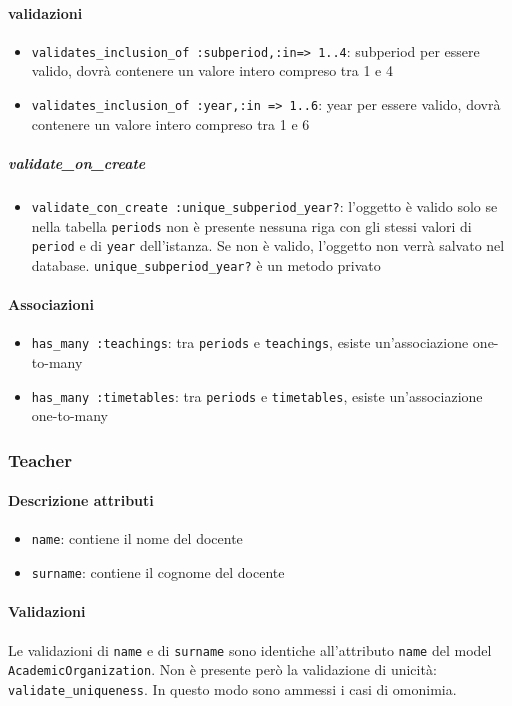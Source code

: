 \documentclass[11pt,a4paper]{article}
\begin{document}
\paragraph{validazioni}
\begin{itemize}
 \item \verb|validates_inclusion_of :subperiod,:in=> 1..4|: subperiod per essere valido, dovrà contenere un valore intero compreso tra 1 e 4
\item \verb|validates_inclusion_of :year,:in => 1..6|: year per essere valido, dovrà contenere un valore intero compreso tra 1 e 6
\end{itemize}
\subparagraph{validate\_on\_create} 
\begin{itemize}
 \item \verb|validate_con_create :unique_subperiod_year?|: l'oggetto è valido solo se nella tabella \verb|periods| non è presente nessuna riga con gli stessi valori di \verb|period| e di \verb|year| dell'istanza. 
Se non è valido, l'oggetto non verrà salvato nel database. \verb|unique_subperiod_year?| è un metodo privato
\end{itemize}
\paragraph{Associazioni}
\begin{itemize}
 \item \verb|has_many :teachings|: tra \verb|periods| e \verb|teachings|, esiste un'associazione one-to-many
 \item \verb|has_many :timetables|: tra \verb|periods| e \verb|timetables|, esiste un'associazione one-to-many
\end{itemize}
\subsubsection{Teacher}
\paragraph{Descrizione attributi}
\begin{itemize}
 \item \verb|name|: contiene il nome del docente
 \item \verb|surname|: contiene il cognome del docente
\end{itemize}
\paragraph{Validazioni}
Le validazioni di \verb|name| e di \verb|surname| sono identiche all'attributo \verb|name| del model \verb|AcademicOrganization|. Non è presente però la validazione di unicità: \verb|validate_uniqueness|. In questo modo sono ammessi i casi di omonimia.
\end{document}
